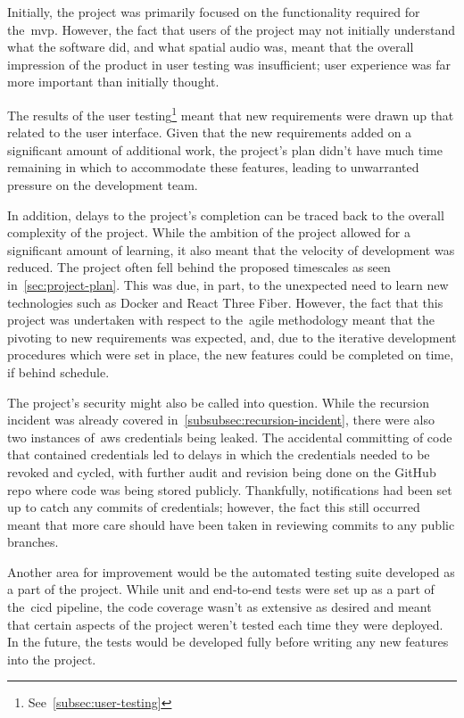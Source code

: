Initially, the project was primarily focused on the functionality required for the~\gls{mvp}.
However, the fact that users of the project may not initially understand what the software did,
and what spatial audio was, meant that the overall impression of the product in user testing was insufficient;
user experience was far more important than initially thought.

The results of the user testing\footnote{See~\ref{subsec:user-testing}} meant
that new requirements were drawn up that related to the user interface.
Given that the new requirements added on a significant amount of additional work,
the project's plan didn't have much time remaining in which to accommodate these features,
leading to unwarranted pressure on the development team.

In addition, delays to the project's completion can be traced back to the overall complexity of the project.
While the ambition of the project allowed for a significant amount of learning,
it also meant that the velocity of development was reduced.
The project often fell behind the proposed timescales as seen in~\ref{sec:project-plan}.
This was due, in part, to the unexpected need to learn new technologies such as Docker and React Three Fiber.
However,
the fact that this project was undertaken with respect to the~\gls{agile} methodology meant
that the pivoting to new requirements was expected, and,
due to the iterative development procedures which were set in place,
the new features could be completed on time, if behind schedule.

The project's security might also be called into question.
While the recursion incident was already covered in~\ref{subsubsec:recursion-incident},
there were also two instances of~\gls{aws} credentials being leaked.
The accidental committing of code that contained credentials led to delays
in which the credentials needed to be revoked and cycled,
with further audit and revision being done on the GitHub repo where code was being stored publicly.
Thankfully, notifications had been set up to catch any commits of credentials;
however, the fact this still occurred meant
that more care should have been taken in reviewing commits to any public branches.

Another area for improvement would be the automated testing suite developed as a part of the project.
While unit and end-to-end tests were set up as a part of the~\gls{cicd} pipeline,
the code coverage wasn't as extensive as desired
and meant that certain aspects of the project weren't tested each time they were deployed.
In the future, the tests would be developed fully before writing any new features into the project.

